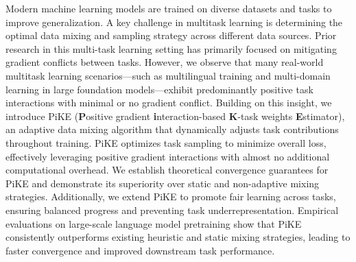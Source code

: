 
Modern machine learning models are trained on diverse datasets and tasks to improve generalization. A key challenge in multitask learning is determining the optimal data mixing and sampling strategy across different data sources. Prior research in this multi-task learning setting has primarily focused on mitigating gradient conflicts between tasks. However, we observe that many real-world multitask learning scenarios—such as multilingual training and multi-domain learning in large foundation models—exhibit predominantly positive task interactions with minimal or no gradient conflict. Building on this insight, we introduce PiKE (\textbf{P}ositive gradient \textbf{i}nteraction-based \textbf{K}-task weights \textbf{E}stimator), an adaptive data mixing algorithm that dynamically adjusts task contributions throughout training. PiKE optimizes task sampling to minimize overall loss, effectively leveraging positive gradient interactions with almost no additional computational overhead. We establish theoretical convergence guarantees for PiKE and demonstrate its superiority over static and non-adaptive mixing strategies. Additionally, we extend PiKE to promote fair learning across tasks, ensuring balanced progress and preventing task underrepresentation.
Empirical evaluations on large-scale language model pretraining show that PiKE consistently outperforms existing heuristic and static mixing strategies, leading to faster convergence and improved downstream task performance.










%
%



%


